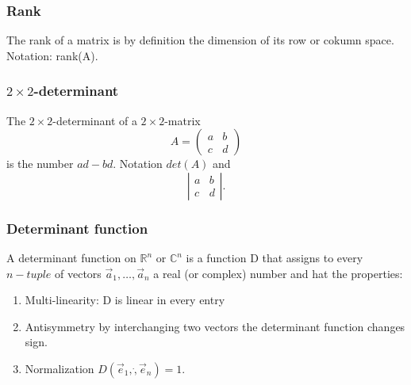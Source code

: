 \documentclass{article}
\begin{document}
			\subsubsection{Rank}
			The rank of a matrix is by definition the dimension of its row or cokumn space. Notation: rank(A).
			
			\subsubsection{$2 \times 2$-determinant}
			The $2\times 2$-determinant of a $2\times2$-matrix
			\begin{equation*}
				A = \begin{pmatrix}
					a & b \\
					c & d
				\end{pmatrix}
			\end{equation*}
			is the number $ad-bd$. Notation $det(A)$ and
			\[
				\left |
					\begin{matrix}
						a & b \\
						c & d
					\end{matrix}
				\right |.
			\]
			
			\subsubsection{Determinant function}
			A determinant function on $\mathbb{R}^n$ or $\mathbb{C}^n$ is a function D that assigns to every $n-tuple$ of vectors $\vec{a}_1,\dots,\vec{a}_n$ a real (or complex) number and hat the properties:
			\begin{enumerate}
				\item Multi-linearity: D is linear in every entry
				\item Antisymmetry by interchanging two vectors the determinant function changes sign.
				\item Normalization $D(\vec{e}_1,\dot,\vec{e}_n) = 1$.
			\end{enumerate}
\end{document}

